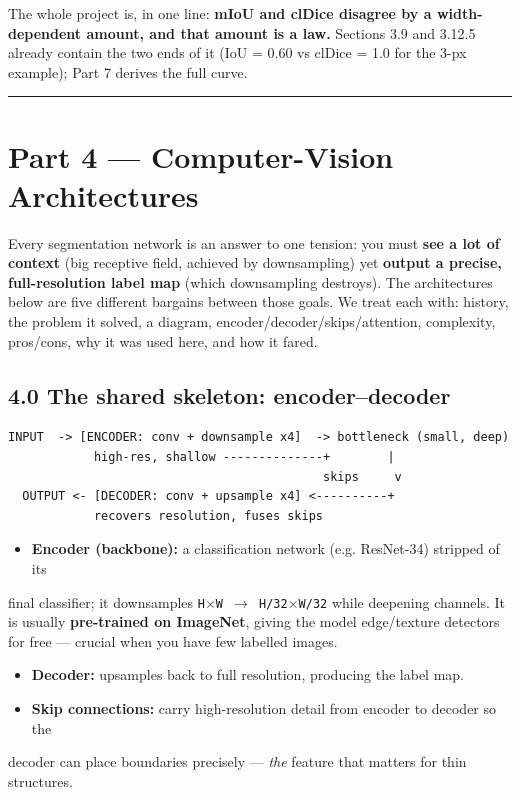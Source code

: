 \documentclass[11pt]{article}
\begin{document}
The whole project is, in one line: \textbf{mIoU and clDice disagree by a width-dependent amount, and that amount is a law.} Sections 3.9 and 3.12.5 already contain the two ends of it (IoU = 0.60 vs clDice = 1.0 for the 3-px example); Part 7 derives the full curve.

\vspace{3pt}\hrule\vspace{3pt}
\clearpage\section*{Part 4 --- Computer-Vision Architectures}

Every segmentation network is an answer to one tension: you must \textbf{see a lot of context} (big receptive field, achieved by downsampling) yet \textbf{output a precise, full-resolution label map} (which downsampling destroys). The architectures below are five different bargains between those goals. We treat each with: history, the problem it solved, a diagram, encoder/decoder/skips/attention, complexity, pros/cons, why it was used here, and how it fared.

\subsection*{4.0 The shared skeleton: encoder--decoder}

\begin{Verbatim}[breaklines=true,breakanywhere=true,fontsize=\footnotesize]
  INPUT  -> [ENCODER: conv + downsample x4]  -> bottleneck (small, deep)
            high-res, shallow --------------+        |
                                            skips     v
  OUTPUT <- [DECODER: conv + upsample x4] <----------+
            recovers resolution, fuses skips
\end{Verbatim}

\begin{itemize}\setlength{\itemsep}{1pt}
\item \textbf{Encoder (backbone):} a classification network (e.g. ResNet-34) stripped of its
\end{itemize}
  final classifier; it downsamples \texttt{H$\times$W $\rightarrow$ H/32$\times$W/32} while deepening channels. It is   usually \textbf{pre-trained on ImageNet}, giving the model edge/texture detectors for   free --- crucial when you have few labelled images.
\begin{itemize}\setlength{\itemsep}{1pt}
\item \textbf{Decoder:} upsamples back to full resolution, producing the label map.
\item \textbf{Skip connections:} carry high-resolution detail from encoder to decoder so the
\end{itemize}
  decoder can place boundaries precisely --- \textit{the} feature that matters for thin   structures.
\end{document}
